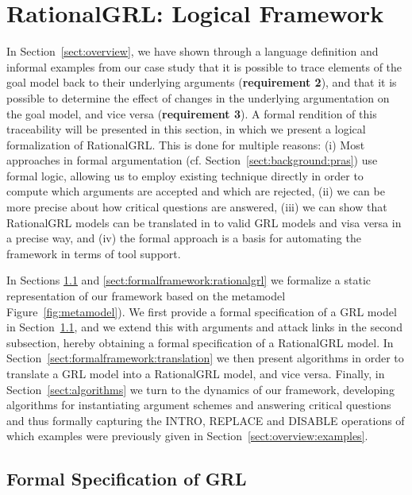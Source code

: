 \section{RationalGRL: Logical Framework}
\label{sect:formalframework}

In Section~\ref{sect:overview}, we have shown through a language definition and informal examples from our case study that it is possible to trace elements of the goal model back to their underlying arguments (\textbf{requirement 2}), and that it is possible to determine the effect of changes in the underlying argumentation on the goal model, and vice versa (\textbf{requirement 3}). A formal rendition of this traceability will be presented in this section, in which we present a logical formalization of RationalGRL. This is done for multiple reasons: (i) Most approaches in formal argumentation (cf. Section~\ref{sect:background:pras}) use formal logic, allowing us to employ existing technique directly in order to compute which arguments are accepted and which are rejected, (ii) we can be more precise about how critical questions are answered, (iii) we can show that RationalGRL models can be translated in to valid GRL models and visa versa in a precise way, and (iv) the formal approach is a basis for automating the framework in terms of tool support.

In Sections \ref{sect:formalframework:grl} and \ref{sect:formalframework:rationalgrl} we formalize a static representation of our framework based on the metamodel Figure~\ref{fig:metamodel}). We first provide a formal specification of a GRL model in Section~\ref{sect:formalframework:grl}, and we extend this with arguments and attack links in the second subsection, hereby obtaining a formal specification of a RationalGRL model. In Section~\ref{sect:formalframework:translation} we then present algorithms in order to translate a GRL model into a RationalGRL model, and vice versa. Finally, in Section~\ref{sect:algorithms} we turn to the dynamics of our framework, developing algorithms for instantiating argument schemes and answering critical questions and thus formally capturing the \textsf{INTRO}, \textsf{REPLACE} and \textsf{DISABLE} operations of which examples were previously given in Section~\ref{sect:overview:examples}. 

\subsection{Formal Specification of GRL}
\label{sect:formalframework:grl}


